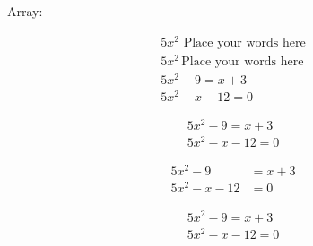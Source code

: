 \documentclass[11pt]{article}
\begin{document}
Array:

\begin{align}
5x^2 \text{ Place your words here}\\
5x^2\, \text{Place your words here}\\
5x^2 - 9 = x + 3\\
5x^2 -x - 12 = 0
\end{align}

\begin{align}
5x^2 - 9 = x + 3\\
5x^2 -x - 12 = 0
\end{align}

\begin{align} %
5x^2 - 9 &= x + 3\\
5x^2 -x - 12 &= 0
\end{align}

\begin{align*} %
5x^2 - 9 = x + 3\\
5x^2 -x - 12 = 0
\end{align*}
\end{document}
